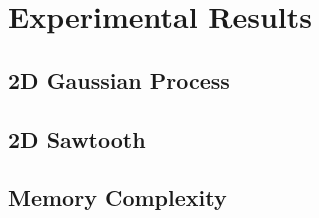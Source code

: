 \documentclass[../../main.tex]{subfiles}
\begin{document}
\section{Experimental Results}

\subsection{2D Gaussian Process}
\subsection{2D Sawtooth}
\subsection{Memory Complexity}





\ifSubfilesClassLoaded{%
    \printbibliography{}
}{} 
\end{document}
